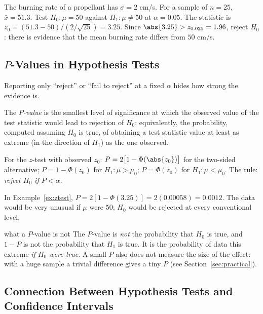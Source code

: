 \begin{example}\label{ex:ztest}
The burning rate of a propellant has $\sigma=2$ cm/s. For a sample of $n=25$, $\bar{x}=51.3$. Test $H_0:\mu=50$ against $H_1:\mu\ne50$ at $\alpha=0.05$. The statistic is $z_0=(51.3-50)/(2/\sqrt{25})=3.25$. Since $\abs{3.25}>z_{0.025}=1.96$, reject $H_0$: there is evidence that the mean burning rate differs from $50$ cm/s.
\end{example}

\subsection{$P$-Values in Hypothesis Tests}

Reporting only ``reject'' or ``fail to reject'' at a fixed $\alpha$ hides how strong the evidence is.

\begin{definition}[$P$-value]
The \emph{$P$-value} is the smallest level of significance at which the observed value of the test statistic would lead to rejection of $H_0$; equivalently, the probability, computed assuming $H_0$ is true, of obtaining a test statistic value at least as extreme (in the direction of $H_1$) as the one observed.
\end{definition}

For the $z$-test with observed $z_0$: $P=2\big[1-\Phi(\abs{z_0})\big]$ for the two-sided alternative; $P=1-\Phi(z_0)$ for $H_1:\mu>\mu_0$; $P=\Phi(z_0)$ for $H_1:\mu<\mu_0$. The rule: \emph{reject $H_0$ if $P<\alpha$.}

\begin{example}
In Example~\ref{ex:ztest}, $P=2[1-\Phi(3.25)]=2(0.00058)=0.0012$. The data would be very unusual if $\mu$ were $50$; $H_0$ would be rejected at every conventional level.
\end{example}

\begin{pitfall}{what a $P$-value is not}
The $P$-value is \emph{not} the probability that $H_0$ is true, and $1-P$ is not the probability that $H_1$ is true. It is the probability of data this extreme \emph{if $H_0$ were true}. A small $P$ also does not measure the size of the effect: with a huge sample a trivial difference gives a tiny $P$ (see Section~\ref{sec:practical}).
\end{pitfall}

\subsection{Connection Between Hypothesis Tests and Confidence Intervals}

